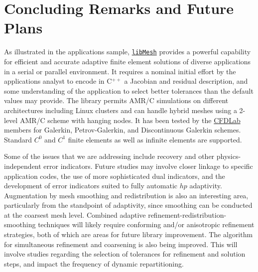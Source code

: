 \documentclass[global,twocolumn,final]{svjour}
\newcommand{\libMesh}{\href{http://libmesh.sourceforge.net}{\texttt{lib\-Mesh}}}
\newcommand{\CFDLab}{\href{http://cfdlab.ae.utexas.edu}{CFDLab}}
\newcommand{\cpp}{C{\tiny$^{++}$}}
\begin{document}
\section{Concluding Remarks and Future Plans\label{sec:conclusion}}
As illustrated in the applications sample, \libMesh{}
provides a powerful capability for efficient and accurate adaptive
finite element solutions of diverse applications in a serial or
parallel environment.  It requires a nominal initial effort by the
applications analyst to encode in \cpp{} a Jacobian and residual
description, and some understanding of the application to select
better tolerances than the default values may provide.  The library
permits AMR/C simulations on different architectures including Linux
clusters and can handle hybrid meshes using a 2-level AMR/C scheme
with hanging nodes.  It has been tested by the \CFDLab{} members for
Galerkin, Petrov-Galerkin, and Discontinuous Galerkin schemes.
Standard $C^0$ and $C^1$ finite elements as well as infinite elements
are supported.


Some of the issues that we are addressing include recovery and other
physics-independent error indicators.  Future studies may involve
closer linkage to specific application codes, the use of more
sophisticated dual indicators, and the development of error indicators
suited to fully automatic $hp$ adaptivity.  Augmentation by mesh
smoothing and redistribution is also an interesting area, particularly
from the standpoint of adaptivity, since smoothing can be conducted at
the coarsest mesh level.  Combined adaptive
refinement-redist\-ribution-smoothing techniques will likely require
conforming and/or anisotropic refinement strategies, both of which are
areas for future library improvement.  The algorithm for simultaneous
refinement and coarsening is also being improved.  This will involve
studies regarding the selection of tolerances for refinement and
solution steps, and impact the frequency of dynamic repartitioning.
\end{document}
